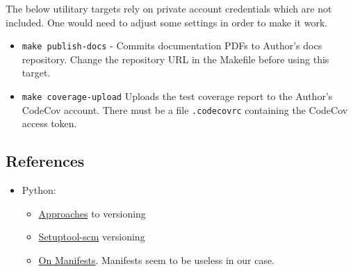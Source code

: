 \begin{itemize}
    The below utilitary targets rely on private account credentials which are
    not included. One would need to adjust some settings in order to make it
    work.

    \begin{itemize}

      \item \texttt{make publish-docs} - Commits documentation PDFs to
        Author's docs repository. Change the repository URL in the Makefile
        before using this target.

      \item \texttt{make coverage-upload} Uploads the test coverage report to
        the Author's CodeCov account. There must be a file \texttt{.codecovrc}
        containing the CodeCov access token.

    \end{itemize}

\end{itemize}


\subsection{References}

\begin{itemize}
  \item Python:
    \begin{itemize}
      \item
        \href{https://packaging.python.org/guides/single-sourcing-package-version/}{Approaches}
        to versioning
      \item
        \href{https://pypi.org/project/setuptools-scm/}{Setuptool-scm} versioning
      \item
        \href{https://docs.python.org/3.7/distutils/sourcedist.html#manifest-template}{On Manifests}. Manifests seem to be useless in our case.
    \end{itemize}
\end{itemize}



